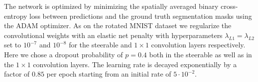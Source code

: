 \documentclass[10pt,twocolumn,letterpaper]{article}
\begin{document}
The network is optimized by minimizing the spatially averaged binary cross-entropy loss between predictions and the ground truth segmentation masks using the ADAM optimizer.
As on the rotated MNIST dataset we regularize the convolutional weights with an elastic net penalty with hyperparameters $\lambda_{L1}=\lambda_{L2}$ set to $10^{-7}$ and $10^{-8}$ for the steerable and $1\times1$ convolution layers respectively.
Here we chose a dropout probability of $p=0.4$ both in the steerable as well as in the $1\times1$ convolution layers.
The learning rate is decayed exponentially by a factor of $0.85$ per epoch starting from an initial rate of $5\cdot10^{-2}$.









\clearpage{\small


}
\end{document}
